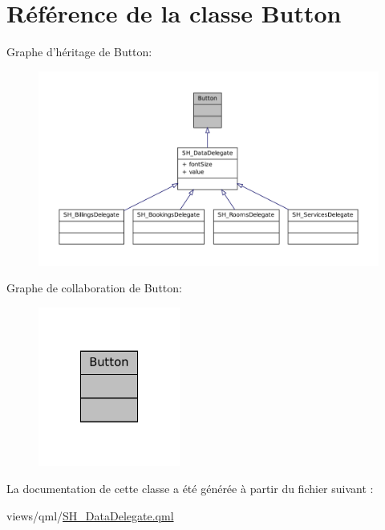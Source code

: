 \hypertarget{classButton}{\section{Référence de la classe Button}
\label{classButton}
}


Graphe d'héritage de Button\-:
\nopagebreak
\begin{figure}[H]
\begin{center}
\leavevmode
\includegraphics[width=350pt]{classButton__inherit__graph}
\end{center}
\end{figure}


Graphe de collaboration de Button\-:
\nopagebreak
\begin{figure}[H]
\begin{center}
\leavevmode
\includegraphics[width=132pt]{classButton__coll__graph}
\end{center}
\end{figure}


La documentation de cette classe a été générée à partir du fichier suivant \-:\begin{DoxyCompactItemize}
\item 
views/qml/\hyperlink{SH__DataDelegate_8qml}{S\-H\-\_\-\-Data\-Delegate.\-qml}\end{DoxyCompactItemize}
